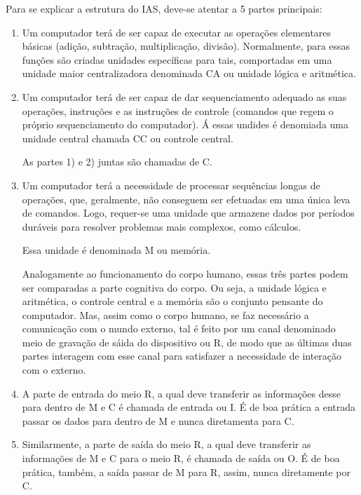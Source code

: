 \documentclass{article}
\begin{document}
Para se explicar a estrutura do IAS, deve-se atentar a 5 partes principais:

\begin{enumerate}
\item Um computador terá de ser capaz de executar as
  operações elementares básicas (adição, subtração, multiplicação,
  divisão). Normalmente, para essas funções são criadas unidades
  específicas para tais, comportadas em uma unidade maior
  centralizadora denominada CA ou unidade lógica e aritmética.

\item Um computador terá de ser capaz de dar sequenciamento adequado as
  suas operações, instruções e as instruções de controle (comandos que
  regem o próprio sequenciamento do computador). Á essas undides é
  denomiada uma unidade central chamada CC ou controle central.

  As partes 1) e 2) juntas são chamadas de C. 

\item Um computador terá a necessidade de processar sequências longas de
  operações, que, geralmente, não conseguem ser efetuadas em uma única
  leva de comandos. Logo, requer-se uma unidade que armazene dados por
  períodos duráveis para resolver problemas mais complexos, como
  cálculos.

  Essa unidade é denominada M ou memória.

  Analogamente ao funcionamento do corpo humano, essas três partes podem
  ser comparadas a parte cognitiva do corpo. Ou seja, a unidade lógica e
  aritmética, o controle central e a memória são o conjunto pensante do
  computador. Mas, assim como o corpo humano, se faz necessário a
  comunicação com o mundo externo, tal é feito por um canal denominado
  meio de gravação de sáida do dispositivo ou R, de modo que as últimas
  duas partes interagem com esse canal para satisfazer a necessidade de
  interação com o externo. 

\item A parte de entrada do meio R, a qual deve transferir as informações
  desse para dentro de M e C é chamada de entrada ou I. É de boa prática a
  entrada passar os dados para dentro de M e nunca diretamenta para C. 

\item Similarmente, a parte de saída do meio R, a qual deve transferir as
  informações de M e C para o meio R, é chamada de saída ou O. É de boa
  prática, também, a saída passar de M para R, assim, nunca diretamente
  por C. 
\end{enumerate}
\end{document}
